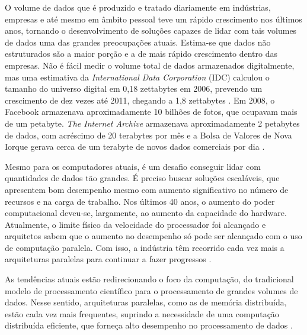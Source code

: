 
O volume de dados que é produzido e tratado diariamente em indústrias, empresas e até mesmo em âmbito pessoal teve um rápido crescimento nos últimos anos, tornando o desenvolvimento de soluções capazes de lidar com tais volumes de dados uma das grandes preocupações atuais. Estima-se que dados não estruturados são a maior porção e a de mais rápido crescimento dentro das empresas. 
Não é fácil medir o volume total de dados armazenados digitalmente, mas uma estimativa da \textit{International Data Corporation} (IDC) calculou o tamanho do universo digital em 0,18 zettabytes em 2006, prevendo um crescimento de dez vezes até 2011, chegando a 1,8 zettabytes \cite{Gantz:2008}.
Em 2008, o Facebook armazenava aproximadamente 10 bilhões de fotos, que ocupavam mais de um petabyte. \textit{The Internet Archive} armazenava aproximadamente 2 petabytes de dados, com acréscimo de 20 terabytes por mês e a Bolsa de Valores de Nova Iorque gerava cerca de um terabyte de novos dados comerciais por dia
\cite{White:2009}. %


Mesmo para os computadores atuais, é um desafio conseguir lidar com quantidades de dados tão grandes. É preciso buscar soluções escaláveis, que apresentem bom desempenho mesmo com aumento significativo no número de recursos e na carga de trabalho. 
Nos últimos 40 anos, o aumento do poder computacional deveu-se, largamente, ao aumento da capacidade do hardware. Atualmente, o limite físico da velocidade do processador foi alcançado e arquitetos sabem que o aumento no desempenho só pode ser alcançado com o uso de computação paralela. Com isso, a indústria têm recorrido cada vez mais a arquiteturas paralelas para continuar a fazer progressos \cite{Manferdelli:2008}. 

As tendências atuais estão redirecionando o foco da computação, do tradicional modelo de processamento científico para o processamento de grandes volumes de dados.
Nesse sentido, arquiteturas paralelas, como as de memória distribuída, estão cada vez mais frequentes, suprindo a necessidade de uma computação distribuída eficiente, que forneça alto desempenho no processamento de dados \cite{Bryant:2011}.


